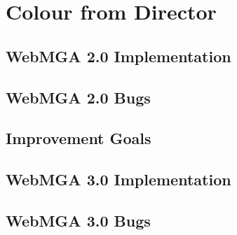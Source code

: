 \section{Colour from Director}
\label{colour_director}
\subsection{WebMGA 2.0 Implementation}
\subsection{WebMGA 2.0 Bugs}
\subsection{Improvement Goals}
\subsection{WebMGA 3.0 Implementation}
\subsection{WebMGA 3.0 Bugs}
